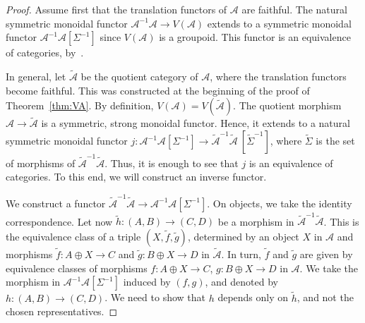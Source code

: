 \documentclass[11pt]{article}
\theoremstyle{plain}
\theoremstyle{definition}
\newcommand{\Acal}{\mathcal A}
\begin{document}
\begin{proof}
Assume first that the translation functors of $\Acal$ are faithful. The natural symmetric monoidal functor $\Acal^{-1}\Acal\to V(\Acal)$ extends to a symmetric monoidal functor $\Acal^{-1}\Acal[\Sigma^{-1}]$ since $V(\Acal)$ is a groupoid. This functor is an equivalence of categories, by~\cite[III, Cor.\,1.2]{JG}.

In general, let $\widetilde{\Acal}$ be the quotient category of $\Acal$, where the translation functors become faithful. This was constructed at the beginning of the proof of Theorem~\ref{thm:VA}. By definition, $V(\Acal)=V(\widetilde{\Acal} )$. The quotient morphism $\Acal\to\widetilde{\Acal}$ is a symmetric, strong monoidal functor. Hence, it extends to a natural symmetric monoidal functor $j\colon \Acal^{-1}\Acal[\Sigma^{-1}]\to\widetilde{\Acal}^{-1}\widetilde{\Acal}\ [\widetilde{\Sigma}^{-1}]$, where $\widetilde{\Sigma}$ is the set of morphisms of $\widetilde{\Acal}^{-1}\widetilde{\Acal}$. Thus, it is enough to see that $j$ is an equivalence of categories. To this end, we will construct an inverse functor.

We construct a functor $\widetilde{\Acal}^{-1}\widetilde{\Acal}\to\Acal^{-1}\Acal[\Sigma^{-1}]$. On objects, we take the identity correspondence. Let now $\widetilde{h}\colon (A,B)\to (C,D)$ be a morphism in $\widetilde{\Acal}^{-1}\widetilde{\Acal}$. This is the equivalence class of a triple $(X,\widetilde{f},\widetilde{g})$, determined by an object $X$ in $\Acal$ and morphisms $\widetilde{f}\colon A\oplus X\to C$ and $\widetilde{g}\colon B\oplus X\to D$ in $\widetilde{\Acal}$. In turn, $\widetilde{f}$ and $\widetilde{g}$ are given by equivalence classes of morphisms $f\colon A\oplus X\to C$, $g\colon B\oplus X\to D$ in $\Acal$. We take the morphism in $\Acal^{-1}\Acal[\Sigma^{-1}]$ induced by $(f,g)$, and denoted by $h\colon (A,B)\to (C,D)$. We need to show that $h$ depends only on $\widetilde{h}$, and not the chosen representatives.


\end{proof}
\end{document}
